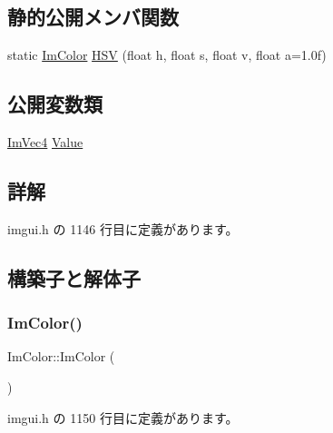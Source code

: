 \subsection*{静的公開メンバ関数}
\begin{DoxyCompactItemize}
\item 
static \mbox{\hyperlink{struct_im_color}{Im\+Color}} \mbox{\hyperlink{struct_im_color_ac8cb52119648523038818a613becf010}{H\+SV}} (float h, float s, float v, float a=1.\+0f)
\end{DoxyCompactItemize}
\subsection*{公開変数類}
\begin{DoxyCompactItemize}
\item 
\mbox{\hyperlink{struct_im_vec4}{Im\+Vec4}} \mbox{\hyperlink{struct_im_color_a4cf43bd58e30decaa0248f839fc85e95}{Value}}
\end{DoxyCompactItemize}


\subsection{詳解}


 imgui.\+h の 1146 行目に定義があります。



\subsection{構築子と解体子}
\mbox{\label{struct_im_color_a95206b688dcc03f725790538c74f4526}} 
\subsubsection{\texorpdfstring{Im\+Color()}{ImColor()}\hspace{0.1cm}{\footnotesize\ttfamily [1/5]}}
{\footnotesize\ttfamily Im\+Color\+::\+Im\+Color (\begin{DoxyParamCaption}{ }\end{DoxyParamCaption})\hspace{0.3cm}{\ttfamily [inline]}}



 imgui.\+h の 1150 行目に定義があります。

